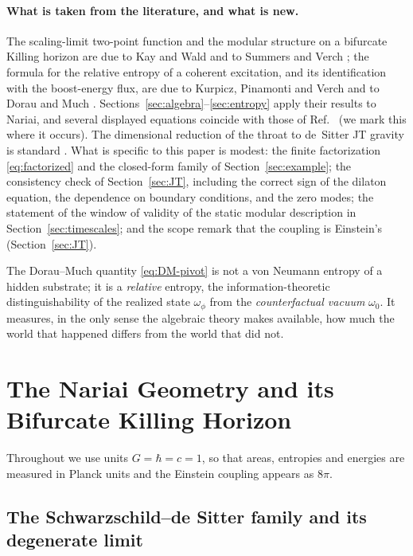 \documentclass[11pt]{article}
\newcommand{\Nariai}{Nariai}
\begin{document}
\paragraph{What is taken from the literature, and what is new.} The scaling-limit two-point function and the modular structure on a bifurcate Killing horizon are due to Kay and Wald \cite{KayWald} and to Summers and Verch \cite{SummersVerch}; the formula for the relative entropy of a coherent excitation, and its identification with the boost-energy flux, are due to Kurpicz, Pinamonti and Verch \cite{KPV} and to Dorau and Much \cite{DorauMuch}. Sections~\ref{sec:algebra}--\ref{sec:entropy} apply their results to \Nariai{}, and several displayed equations coincide with those of Ref.~\cite{DorauMuch} (we mark this where it occurs). The dimensional reduction of the throat to de~Sitter JT gravity is standard \cite{MertensTuriaci}. What is specific to this paper is modest: the finite factorization \eqref{eq:factorized} and the closed-form family of Section~\ref{sec:example}; the consistency check of Section~\ref{sec:JT}, including the correct sign of the dilaton equation, the dependence on boundary conditions, and the zero modes; the statement of the window of validity of the static modular description in Section~\ref{sec:timescales}; and the scope remark that the coupling is Einstein's (Section~\ref{sec:JT}).

The Dorau--Much quantity \eqref{eq:DM-pivot} is not a von Neumann entropy of a hidden substrate; it is a \emph{relative} entropy, the information-theoretic distinguishability of the realized state $\omega_\phi$ from the \emph{counterfactual vacuum} $\omega_0$. It measures, in the only sense the algebraic theory makes available, how
much the world that happened differs from the world that did not.


\section{The \Nariai{} Geometry and its Bifurcate Killing Horizon}
\label{sec:geometry}

Throughout we use units $G = \hbar = c = 1$, so that areas, entropies and energies are measured in Planck units and the Einstein coupling appears as $8\pi$.

\subsection{The Schwarzschild--de Sitter family and its degenerate limit}
\end{document}
